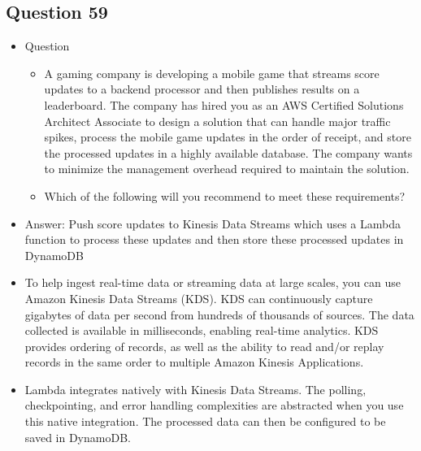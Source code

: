 \documentclass[]{scrartcl}
\begin{document}
\subsection{Question 59}
\begin{itemize}
	\item Question
	\begin{itemize}
		\item A gaming company is developing a mobile game that streams score updates to a backend processor and then publishes results on a leaderboard. The company has hired you as an AWS Certified Solutions Architect Associate to design a solution that can handle major traffic spikes, process the mobile game updates in the order of receipt, and store the processed updates in a highly available database. The company wants to minimize the management overhead required to maintain the solution.
		\item Which of the following will you recommend to meet these requirements?
	\end{itemize}
	\item Answer: Push score updates to Kinesis Data Streams which uses a Lambda function to process these updates and then store these processed updates in DynamoDB
	\item To help ingest real-time data or streaming data at large scales, you can use Amazon Kinesis Data Streams (KDS). KDS can continuously capture gigabytes of data per second from hundreds of thousands of sources. The data collected is available in milliseconds, enabling real-time analytics. KDS provides ordering of records, as well as the ability to read and/or replay records in the same order to multiple Amazon Kinesis Applications.
	\item Lambda integrates natively with Kinesis Data Streams. The polling, checkpointing, and error handling complexities are abstracted when you use this native integration. The processed data can then be configured to be saved in DynamoDB.
\end{itemize}
\end{document}
